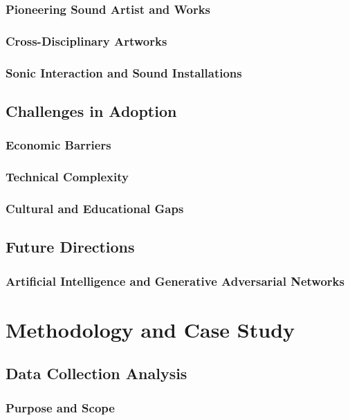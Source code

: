 \documentclass[a4paper, 12pt]{report}
\begin{document}
        \subsection{Pioneering Sound Artist and Works}
        \subsection{Cross-Disciplinary Artworks}
        \subsection{Sonic Interaction and Sound Installations}
    \section{Challenges in Adoption}
        \subsection{Economic Barriers}
        \subsection{Technical Complexity}
        \subsection{Cultural and Educational Gaps}
    \section{Future Directions}
        \subsection{Artificial Intelligence and Generative Adversarial Networks}


\chapter{Methodology and Case Study}
    \section{Data Collection Analysis}
        \subsection{Purpose and Scope}
\end{document}
